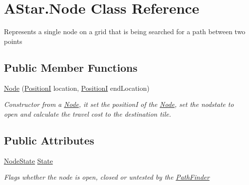 \hypertarget{classAStar_1_1Node}{\section{A\-Star.\-Node Class Reference}
\label{classAStar_1_1Node}
}


Represents a single node on a grid that is being searched for a path between two points  


\subsection*{Public Member Functions}
\begin{DoxyCompactItemize}
\item 
\hyperlink{classAStar_1_1Node_a937f422d6e30afb82921967fdeb1a27b}{Node} (\hyperlink{classCore_1_1Models_1_1PositionI}{Position\-I} location, \hyperlink{classCore_1_1Models_1_1PositionI}{Position\-I} end\-Location)
\begin{DoxyCompactList}\small\item\em Constructor from a \hyperlink{classAStar_1_1Node}{Node}, it set the position\-I of the \hyperlink{classAStar_1_1Node}{Node}, set the nodstate to open and calculate the travel cost to the destination tile. \end{DoxyCompactList}\end{DoxyCompactItemize}
\subsection*{Public Attributes}
\begin{DoxyCompactItemize}
\item 
\hyperlink{namespaceAStar_a44d96e2d4066e21483fa07d62358c358}{Node\-State} \hyperlink{classAStar_1_1Node_a71d509fe94dee571f3852c9f60c63e13}{State}
\begin{DoxyCompactList}\small\item\em Flags whether the node is open, closed or untested by the \hyperlink{classAStar_1_1PathFinder}{Path\-Finder} \end{DoxyCompactList}\end{DoxyCompactItemize}
